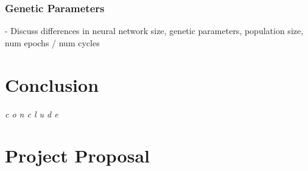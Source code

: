 \documentclass[12pt,a4paper,twoside,openright]{report}
\begin{document}
 \subsection{Genetic Parameters}
 
 - Discuss differences in neural network size, genetic parameters, population size, num epochs / num cycles



\chapter{Conclusion}

\emph{c o n c l u d e}




\appendix

\chapter{Project Proposal}


\end{document}
